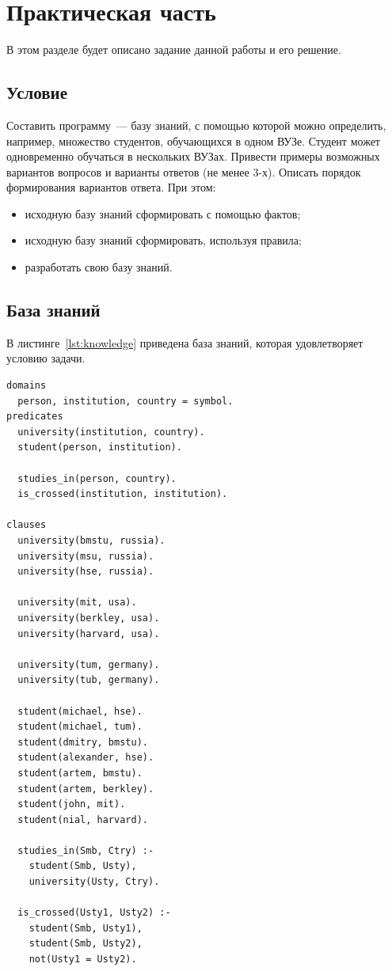 \chapter{Практическая часть}
\lstset{language=prolog}

В этом разделе будет описано задание данной работы и его решение.

\section{Условие}
Составить программу~--– базу знаний, с помощью которой можно определить, например, множество студентов, обучающихся в одном ВУЗе. Студент может одновременно обучаться в нескольких ВУЗах. Привести примеры возможных вариантов вопросов и варианты ответов (не менее 3-х). Описать порядок формирования вариантов ответа. При этом:
\begin{itemize}
    \item исходную базу знаний сформировать с помощью фактов;
    \item исходную базу знаний сформировать, используя правила;
    \item разработать свою базу знаний.
\end{itemize}

\section{База знаний}
В листинге~\ref{lst:knowledge} приведена база знаний, которая удовлетворяет условию задачи.
\begin{lstlisting}[caption={База знаний},label=lst:knowledge]
domains
  person, institution, country = symbol.
predicates
  university(institution, country).
  student(person, institution).

  studies_in(person, country).
  is_crossed(institution, institution).

clauses
  university(bmstu, russia).
  university(msu, russia).
  university(hse, russia).

  university(mit, usa).
  university(berkley, usa).
  university(harvard, usa).

  university(tum, germany).
  university(tub, germany).

  student(michael, hse).
  student(michael, tum).
  student(dmitry, bmstu).
  student(alexander, hse).
  student(artem, bmstu).
  student(artem, berkley).
  student(john, mit).
  student(nial, harvard).

  studies_in(Smb, Ctry) :-
    student(Smb, Usty),
    university(Usty, Ctry).

  is_crossed(Usty1, Usty2) :-
    student(Smb, Usty1),
    student(Smb, Usty2),
    not(Usty1 = Usty2).
\end{lstlisting}

